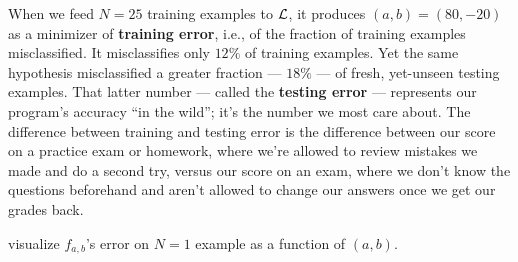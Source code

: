         When we feed $N=25$ training examples to $\mathcal{L}$, it produces
        $(a,b)=(80,-20)$ as a minimizer of \textbf{training error}, i.e.,
        of the fraction of training examples misclassified.  It misclassifies
        only $12\%$ of training examples. Yet the same
        hypothesis misclassified a greater fraction --- $18\%$ --- of fresh,
        yet-unseen testing examples.
        That latter number --- called the \textbf{testing error} --- represents
        our program's accuracy ``in the wild'';
        it's the number we most care about.  The difference between training
        and testing error is the difference between our score on a practice
        exam or homework, where we're allowed to review mistakes we made and
        do a second try, versus our score on an exam, where we don't know the
        questions beforehand and aren't allowed to change our answers once we
        get our grades back.

        \noindent
         {visualize $f_{a,b}$'s error on $N=1$ example as a
        function of $(a,b)$.}


